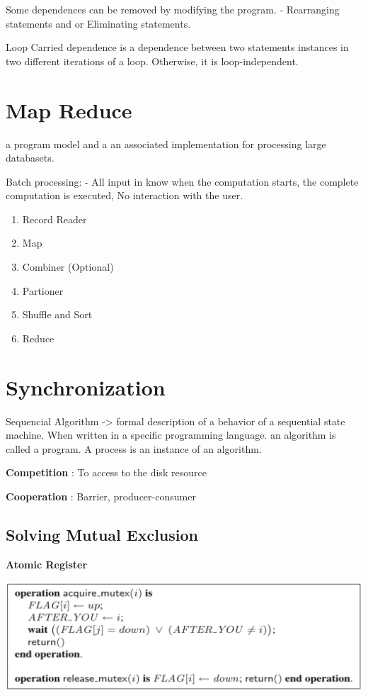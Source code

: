 Some dependences can be removed by modifying the program. - Rearranging statements and or Eliminating statements.\par

Loop Carried dependence is a dependence between two statements instances in two different iterations of a loop. Otherwise, it is loop-independent.

\section{Map Reduce}

a program model and a an associated implementation for processing large databasets.\par
Batch processing: - All input in know when the computation starts, the complete computation is executed, No interaction with the user.\par

\begin{enumerate}
    \item Record Reader
    \item Map
    \item Combiner (Optional)
    \item Partioner
    \item Shuffle and Sort
    \item Reduce
\end{enumerate}

\section{Synchronization}

Sequencial Algorithm -> formal description of a behavior of a sequential state machine. When written in a specific programming language. an algorithm is called a program. A process is an instance of an algorithm.\par

\textbf{Competition} : To access to the disk resource\par
\textbf{Cooperation} : Barrier, producer-consumer

\subsection{Solving Mutual Exclusion}
\textbf{Atomic Register}\par 

\includegraphics[width=\linewidth]{img/ema.png}

